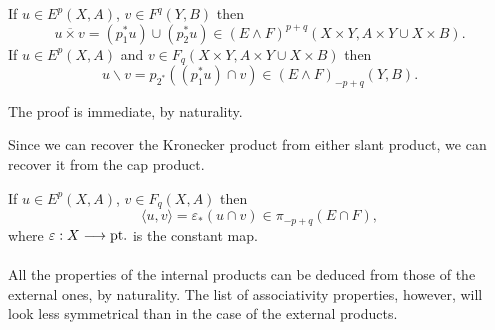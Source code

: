 \documentclass[../main]{subfiles}
\begin{document}
\begin{proposition}\label{prop:p3ch09.13}
If $u \in E^p(X, A)$, $v \in F^q(Y, B)$ then \[u \overline \times v = (p_1^\ast u) \cup (p_2^\ast u) \in (E \wedge F)^{p + q}(X \times Y, A \times Y \cup X \times B).\] If $u \in E^p(X, A)$ and $v \in F_q(X \times Y, A \times Y \cup X \times B)$ then \[u \backslash v = p_{2^\ast} ((p_1^\ast u) \cap v) \in (E \wedge F)_{-p + q}(Y, B).\] 
\end{proposition}

The proof is immediate, by naturality. 

Since we can recover the Kronecker product from either slant product, we can recover it from the cap product. 

\begin{proposition}\label{prop:p3ch09.14}
If $u \in E^p(X, A)$, $v \in F_q(X, A)$ then \[\langle u, v\rangle = \varepsilon_\ast (u \cap v) \in \pi_{-p + q}(E \cap F),\] where $\varepsilon : X \lar{} \mathrm{pt}.$ is the constant map. 
\end{proposition}

All the properties of the internal products can be deduced from those of the external ones, by naturality. The list of associativity properties, however, will look less symmetrical than in the case of the external products.
\end{document}
